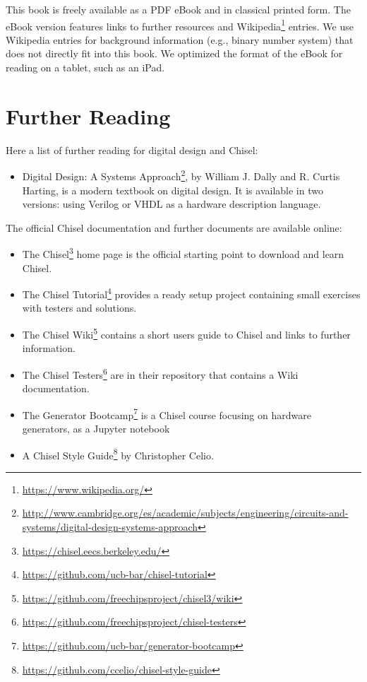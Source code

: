 \documentclass[%
    10pt,
    headinclude, footexclude,
    openright, %
    notitlepage,
    cleardoubleempty,
    headsepline,
    pointlessnumbers,
    bibtotoc, idxtotoc,
    ]{scrbook}
\newcommand{\myref}[2]{\href{#1}{#2}}
\renewcommand{\myref}[2]{{#2}{\footnote{\url{#1}}}}
\begin{document}
This book is freely available as a PDF eBook and in classical printed form.
The eBook version features links to further resources
and \myref{https://www.wikipedia.org/}{Wikipedia} entries.
We use Wikipedia entries for background information (e.g., binary number system)
that does not directly fit into this book.
We optimized the format of the eBook for reading on a tablet, such as an iPad.

\section{Further Reading}

Here a list of further reading for digital design and Chisel:
\begin{itemize}
\item \myref{http://www.cambridge.org/es/academic/subjects/engineering/circuits-and-systems/digital-design-systems-approach}{Digital Design: A Systems Approach}, by William J. Dally and R. Curtis Harting,
is a modern textbook on digital design. It is available in two versions: using Verilog or VHDL as a hardware description language.
\end{itemize}

The official Chisel documentation and further documents are available online:

\begin{itemize}
\item The \myref{https://chisel.eecs.berkeley.edu/}{Chisel} home page is the official starting point to
download and learn Chisel.
\item The \myref{https://github.com/ucb-bar/chisel-tutorial}{Chisel Tutorial} provides a ready setup
project containing small exercises with testers and solutions.

\item The \myref{https://github.com/freechipsproject/chisel3/wiki}{Chisel Wiki} contains
a short users guide to Chisel and links to further information.
\item The \myref{https://github.com/freechipsproject/chisel-testers}{Chisel Testers} are in
their repository that contains a Wiki documentation.
\item The \myref{https://github.com/ucb-bar/generator-bootcamp}{Generator Bootcamp} is
a Chisel course focusing on hardware generators, as a Jupyter notebook
\item A \myref{https://github.com/ccelio/chisel-style-guide}{Chisel Style Guide} by Christopher Celio.
\end{itemize}
\end{document}
